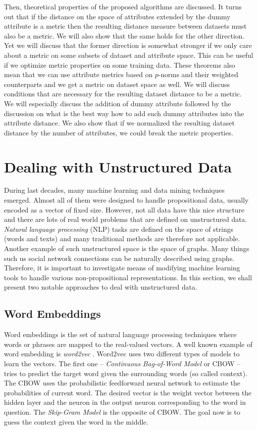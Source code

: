 Then, theoretical properties of the proposed algorithms are discussed. It turns out that if the distance on the space of attributes extended by the dummy attribute is a metric then the resulting distance measure between datasets must also be a metric. We will also show that the same holds for the other direction. Yet we will discuss that the former direction is somewhat stronger if we only care about a metric on some subsets of dataset and attribute space. This can be useful if we optimize metric properties on some training data. These theorems also mean that we can use attribute metrics based on $p$-norms and their weighted counterparts and we get a metric on dataset space as well. We will discuss conditions that are necessary for the resulting dataset distance to be a metric. We will especially discuss the addition of dummy attribute followed by the discussion on what is the best way how to add such dummy attributes into the attribute distance. We also show that if we normalized the resulting dataset distance by the number of attributes, we could break the metric properties.

\section{Dealing with Unstructured Data}
During last decades, many machine learning and data mining techniques emerged. Almost all of them were designed to handle propositional data, usually encoded as a vector of fixed size.
However, not all data have this nice structure and there are lots of real world problems that are defined on unstructured data. \emph{Natural language processing} (NLP) tasks are defined on the space of strings (words and texts) and many traditional methods are  therefore not applicable. Another example of such unstructured space is the space of graphs. Many things such us social network connections can be naturally described using graphs. Therefore, it is important to investigate means of modifying machine learning tools to handle various non-propositional representations.
In this section, we shall present two notable approaches to deal with unstructured data.


\subsection{Word Embeddings}
Word embeddings is the set of natural language processing techniques where words or phrases are mapped to the real-valued vectors.
A well known example of word embedding is \emph{word2vec} \cite{word2vec,mikolovDistirbutedRepresentationsOfWords}.
Word2vec uses two different types of models to learn the vectors. The first one -- \emph{Continuous Bag-of-Word Model} or CBOW -- tries to predict the target word given the surrounding words (so called context). The CBOW uses the probabilistic feedforward neural network \cite{BengioNeuralProbabilisticLanguageModel} to  estimate the probabilities of current word. The desired vector is the weight vector between the hidden layer and the neuron in the output neuron corresponding to the word in question. The \emph{Skip-Gram Model} is the opposite of CBOW. The goal now is to guess the context given the word in the middle. 

